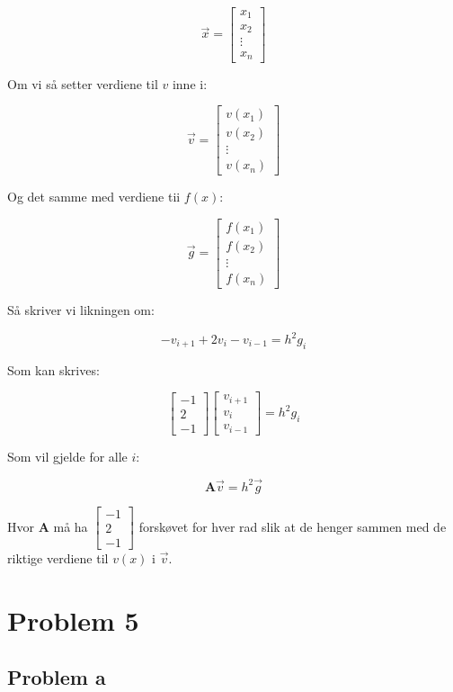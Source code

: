 \documentclass[english,notitlepage]{revtex4-1}  %
\begin{document}
$$\vec{x} = \begin{bmatrix}
x_1 \\ x_2 \\ \vdots \\ x_n
\end{bmatrix}$$

Om vi så setter verdiene til $v$ inne i:

$$ \vec{v} = \begin{bmatrix}
v(x_1) \\ v(x_2) \\ \vdots \\ v(x_n)
\end{bmatrix}$$

Og det samme med verdiene tii $f(x)$:

$$\vec{g} = \begin{bmatrix}
f(x_1) \\ f(x_2) \\ \vdots \\ f(x_n)
\end{bmatrix}$$

Så skriver vi likningen om:

$$-v_{i+1} + 2v_{i} - v_{i-1} = h^2g_i$$

Som kan skrives:

$$\begin{bmatrix}
-1 \\ 2 \\ -1
\end{bmatrix}\begin{bmatrix}
v_{i+1} \\ v_i \\ v_{i-1}
\end{bmatrix} = h^2 g_i $$

Som vil gjelde for alle $i$:

$$\textbf{A} \vec{v} = h^2 \vec{g} $$

Hvor \textbf{A} må ha $\begin{bmatrix}
-1 \\ 2 \\ -1
\end{bmatrix}$ forskøvet for hver rad slik at de henger sammen med de riktige verdiene til $v(x)$ i $\vec{v}$.


\section*{Problem 5}


\subsection*{Problem a}
\end{document}
